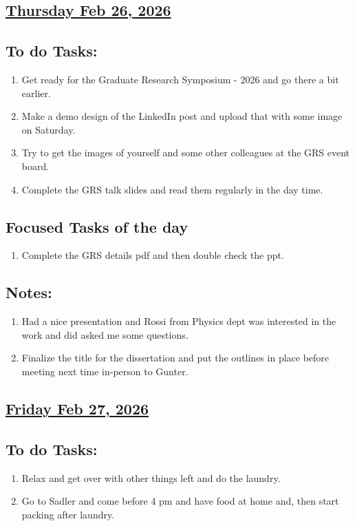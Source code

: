 \subsection*{\underline{Thursday Feb 26, 2026}}
\subsection*{To do Tasks:}
\begin{enumerate}
    \item Get ready for the Graduate Research Symposium - 2026 and go there a bit earlier. \cmark 
    \item Make a demo design of the LinkedIn post and upload that with some image on Saturday. \xmark
    \item Try to get the images of yourself and some other colleagues at the GRS event board. \cmark
    \item Complete the GRS talk slides and read them regularly in the day time. \cmark
\end{enumerate}
\subsection*{Focused Tasks of the day}
\begin{enumerate}[\ding{212}]  
    \item Complete the GRS details pdf and then double check the ppt. \cmark
\end{enumerate}
\subsection*{Notes:}
\begin{enumerate}
    \item Had a nice presentation and Rossi from Physics dept was interested in the work and did asked me some questions.
    \item Finalize the title for the dissertation and put the outlines in place before meeting next time in-person to Gunter.
\end{enumerate}
\subsection*{\underline{Friday Feb 27, 2026}}
\subsection*{To do Tasks:}
\begin{enumerate}
    \item Relax and get over with other things left and do the laundry.
    \item Go to Sadler and come before 4 pm and have food at home and, then start packing after laundry.
\end{enumerate}
